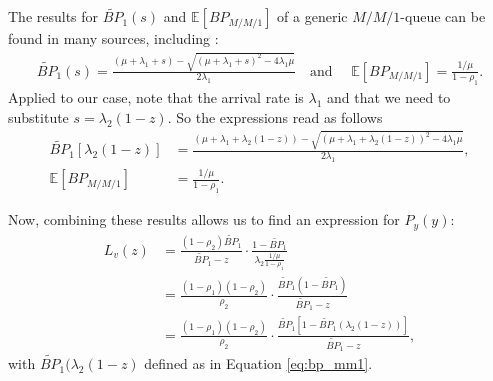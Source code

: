 The results for $\widetilde{BP}_1(s)$ and $\mathbb{E}\left[BP_{M/M/1}\right]$ of a generic $M/M/1$-queue can be found in many sources, including \cite{adan2002queueing}:
\begin{align*}
    \widetilde{BP}_1(s) = \frac{
   ( \mu + \lambda_1 + s) - \sqrt{( \mu + \lambda_1 + s)^2-4\lambda_1 \mu}
    }{2\lambda_1}
    \quad \text{and } \quad
    \mathbb{E}\left[BP_{M/M/1}\right] = \frac{1/ \mu}{1 - \rho_1}.
\end{align*}
Applied to our case, note that the arrival rate is $\lambda_1$ and that we need to substitute $s=\lambda_2(1-z)$. So the expressions read as follows
\begin{align}
    \widetilde{BP}_1\!\left[\lambda_2(1-z)\right]
    &=
    \frac{
  (\mu + \lambda_1 + \lambda_2(1-z))
    - \sqrt{(\mu + \lambda_1 + \lambda_2(1-z))^2 - 4\lambda_1 \mu}
    }{
    2\lambda_1
    },
    \label{eq:bp_mm1}\\
    \mathbb{E}\!\left[BP_{M/M/1}\right]
    &= \frac{1/\mu}{1 - \rho_1}
    \label{eq:ebp_mm1}.
\end{align}

Now, combining these results allows us to find an expression for $P_y(y)$:
\begin{align*}
    L_v(z) 
    &=  \frac{
            (1-\rho_2)\widetilde{BP}_1
        }{
            \widetilde{BP}_1  - z
        }
        \cdot
        \frac{1 - \widetilde{BP}_1 }{\lambda_2\frac{1/\mu}{1 - \rho_1}} \\
    &=  \frac{
            (1 - \rho_1)(1 - \rho_2)
        }{
            \rho_2
        } 
        \cdot
        \frac{
            \widetilde{BP}_1(1 - \widetilde{BP}_1)
        }{
            \widetilde{BP}_1-z
        } \\
    &=  \frac{(1 - \rho_1)(1 - \rho_2)}{ \rho_2} 
        \cdot
        \frac{
            \widetilde{BP}_1 \left[1 - \widetilde{BP}_1(\lambda_2(1-z))\right]
        }{
            \widetilde{BP}_1 - z
        },
\end{align*}
with $\widetilde{BP}_1(\lambda_2(1-z)$ defined as in Equation \eqref{eq:bp_mm1}.

